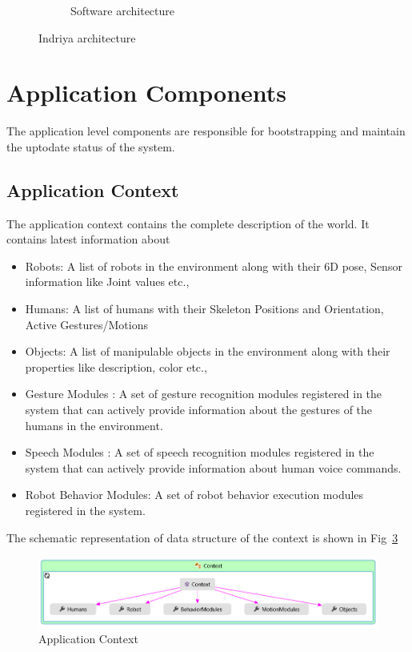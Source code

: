 \begin{figure}
\begin{subfigure}[t]{0.48\textwidth}
\caption[Software architecture]{Software architecture}
\label{fig:architecture}
\end{subfigure}
\caption[Indriya architecture]{Indriya architecture}
\label{fig:indriya_arch}
\end{figure}
\section{Application Components}
\label{ssec:app_comp}
The application level components are responsible for bootstrapping and maintain the uptodate status of the system. 
\subsection*{Application Context}
The application context contains the complete description of the world. It contains latest information about
\begin{itemize}[leftmargin={1cm},topsep={0pt},itemsep={0pt},partopsep={0pt},parsep={0pt}] 
\item Robots: A list of robots in the environment along with their 6D pose, Sensor information like Joint values etc.,
\item Humans: A list of humans with their Skeleton Positions and Orientation, Active Gestures/Motions
\item Objects: A list of manipulable objects in the environment along with their properties like description, color etc.,
\item Gesture Modules : A set of gesture recognition modules registered in the system that can actively provide information about the gestures of the humans in the environment.
\item Speech Modules : A set of speech recognition modules registered in the system that can actively provide information about human voice commands.
\item Robot Behavior Modules: A set of robot behavior execution modules registered in the system.
\end{itemize}
The schematic representation of data structure of the context is shown in Fig~\ref{fig:system_context}
\begin{figure}
\centering
\includegraphics[width=\textwidth]{assets/context_diagram.png}
\caption[Application Context]{Application Context}
\label{fig:system_context}
\end{figure}
